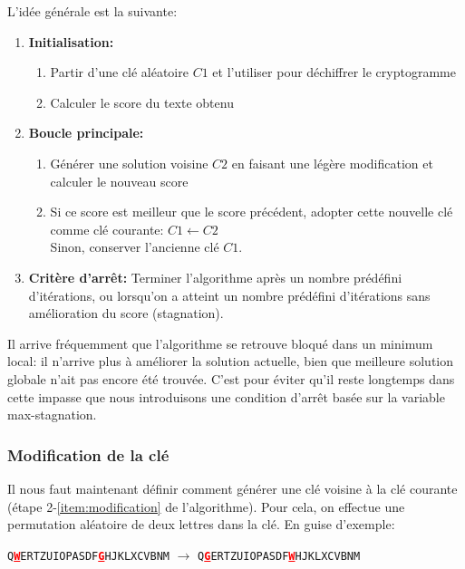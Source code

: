 \documentclass[a4paper]{article}
\newcommand{\highlight}[1]{\textbf{\textcolor{red}{\underline{#1}}}}
\begin{document}
L’idée générale est la suivante:
\begin{enumerate}
    \item \textbf{Initialisation:}
    \begin{enumerate}
        \item Partir d'une clé aléatoire $C1$ et l'utiliser pour déchiffrer le cryptogramme
        \item Calculer le score du texte obtenu
    \end{enumerate}
    \item \textbf{Boucle principale:}
    \begin{enumerate}[label= (\alph*)]
        \item\label{item:modification} Générer une solution voisine $C2$ en faisant une légère modification et calculer le nouveau score
        \item Si ce score est meilleur que le score précédent, adopter cette nouvelle clé comme clé courante: $C1 \leftarrow C2$\\
              Sinon, conserver l’ancienne clé $C1$.
    \end{enumerate}
    \item \textbf{Critère d'arrêt:} Terminer l'algorithme après un nombre prédéfini d'itérations, ou lorsqu'on a atteint un nombre prédéfini d'itérations sans amélioration du score (stagnation).
\end{enumerate}

Il arrive fréquemment que l’algorithme se retrouve bloqué dans un minimum local: il n’arrive plus à améliorer la solution actuelle, bien que meilleure solution globale n’ait pas encore été trouvée.  
C'est pour éviter qu'il reste longtemps dans cette impasse que nous introduisons une condition d'arrêt basée sur la variable max-stagnation.

\subsubsection*{Modification de la clé}\label{modification}

Il nous faut maintenant définir comment générer une clé voisine à la clé courante (étape 2-\ref{item:modification} de l’algorithme).  
Pour cela, on effectue une permutation aléatoire de deux lettres dans la clé. En guise d'exemple:
\begin{center}
\texttt{Q\highlight{W}ERTZUIOPASDF\highlight{G}HJKLXCVBNM} $\rightarrow$ \texttt{Q\highlight{G}ERTZUIOPASDF\highlight{W}HJKLXCVBNM}
\end{center}
\end{document}
